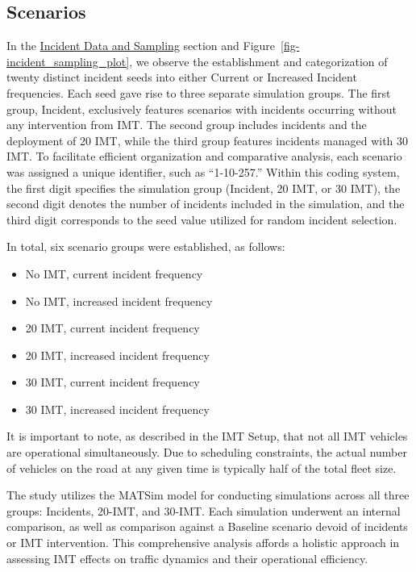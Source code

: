 \documentclass[fancy, oneside, mastersfancy, ms]{byuthesis}
\providecommand{\tightlist}{%
  \setlength{\itemsep}{0pt}\setlength{\parskip}{0pt}}\usepackage{longtable,booktabs,array}
\begin{document}
\hypertarget{sec-scenarios}{%
\subsection{Scenarios}\label{sec-scenarios}}

In the \protect\hyperlink{sec-inc_data}{Incident Data and Sampling}
section and Figure~\ref{fig-incident_sampling_plot}, we observe the
establishment and categorization of twenty distinct incident seeds into
either Current or Increased Incident frequencies. Each seed gave rise to
three separate simulation groups. The first group, Incident, exclusively
features scenarios with incidents occurring without any intervention
from IMT. The second group includes incidents and the deployment of 20
IMT, while the third group features incidents managed with 30 IMT. To
facilitate efficient organization and comparative analysis, each
scenario was assigned a unique identifier, such as ``1-10-257.'' Within
this coding system, the first digit specifies the simulation group
(Incident, 20 IMT, or 30 IMT), the second digit denotes the number of
incidents included in the simulation, and the third digit corresponds to
the seed value utilized for random incident selection.

In total, six scenario groups were established, as follows:

\begin{itemize}
\tightlist
\item
  No IMT, current incident frequency
\item
  No IMT, increased incident frequency
\item
  20 IMT, current incident frequency
\item
  20 IMT, increased incident frequency
\item
  30 IMT, current incident frequency
\item
  30 IMT, increased incident frequency
\end{itemize}

It is important to note, as described in the IMT Setup, that not all IMT
vehicles are operational simultaneously. Due to scheduling constraints,
the actual number of vehicles on the road at any given time is typically
half of the total fleet size.

The study utilizes the MATSim model for conducting simulations across
all three groups: Incidents, 20-IMT, and 30-IMT. Each simulation
underwent an internal comparison, as well as comparison against a
Baseline scenario devoid of incidents or IMT intervention. This
comprehensive analysis affords a holistic approach in assessing IMT
effects on traffic dynamics and their operational efficiency.
\end{document}
